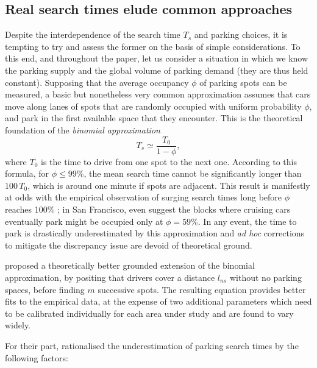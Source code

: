 \documentclass[trsc,reprint]{informs3}
\newcommand{\AN}[1]{#1}
\begin{document}
\subsection{Real search times elude common approaches}
\label{sub:binomial_approx}
Despite the interdependence of the search time $T_s$ and parking choices, it is tempting
to try and assess the former on the basis of simple considerations. To this end, and throughout the paper, 
let us consider a situation in which \AN{we know} the parking supply and the global volume
of parking demand \AN{(they are thus held constant)}. Supposing that the average occupancy ${\phi}$ of
parking spots \AN{can be measured}, a basic but nonetheless very common approximation \citep{anderson2004economics,geroliminis2015cruising} assumes that cars move along lanes of spots that are randomly occupied with uniform probability ${\phi}$, and park in the
first available space that they encounter. This is the theoretical foundation of
the \emph{binomial approximation} 
\begin{equation*}
T_s \simeq \frac{T_0}{1-{\phi}},
\end{equation*}
where $T_0$ is the time to drive from one spot to the next one. According to this formula, for ${\phi} \leqslant 99\%$, the mean search time cannot be significantly longer than $100\,T_0$, which is around one minute if spots are adjacent. 
This result is manifestly at odds with the empirical observation of surging search times long before ${\phi}$ reaches 100\% \citep{arnott2017cruising,gu2020macroscopic,weinberger2020parking}; in San Francisco, \citet{weinberger2020parking} even suggest the blocks where cruising cars eventually park might be occupied only at ${\phi}=59\%$. In any event,
 the time to park is drastically underestimated by this approximation and \emph{ad hoc} corrections to mitigate the discrepancy issue \citep{belloche2015street} are devoid of theoretical ground.
 \AN{
\citet{leclercq2017dynamic} proposed a theoretically better grounded extension of the binomial approximation, by positing that drivers cover a distance $l_{ns}$ without no parking spaces, before finding $m$ successive spots. The resulting equation provides better fits to the empirical data, at the expense of two additional parameters which need to be calibrated individually for each area under study and are found to vary widely.
 }
For their part, \citet{arnott2017cruising} rationalised the underestimation of parking search times by
the following factors: 
\end{document}
